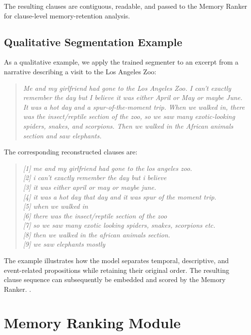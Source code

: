 \documentclass[conference]{IEEEtran}
\begin{document}
The resulting clauses are contiguous, readable, and passed to the Memory Ranker for clause-level memory-retention analysis.

\subsection{Qualitative Segmentation Example}

As a qualitative example, we apply the trained segmenter to an excerpt from a narrative describing a visit to the Los Angeles Zoo:

\begin{quote}
\footnotesize
\textit{Me and my girlfriend had gone to the Los Angeles Zoo. I can't exactly remember the day but I believe it was either April or May or maybe June. It was a hot day and a spur-of-the-moment trip. When we walked in, there was the insect/reptile section of the zoo, so we saw many exotic-looking spiders, snakes, and scorpions. Then we walked in the African animals section and saw elephants.}
\end{quote}

The corresponding reconstructed clauses are:

\begin{quote}
\footnotesize
\textit{[1] me and my girlfriend had gone to the los angeles zoo.}\\
\textit{[2] i can't exactly remember the day but i believe}\\
\textit{[3] it was either april or may or maybe june.}\\
\textit{[4] it was a hot day that day and it was spur of the moment trip.}\\
\textit{[5] when we walked in}\\
\textit{[6] there was the insect/reptile section of the zoo}\\
\textit{[7] so we saw many exotic looking spiders, snakes, scorpions etc.}\\
\textit{[8] then we walked in the african animals section.}\\
\textit{[9] we saw elephants mostly}\\
\end{quote}

The example illustrates how the model separates temporal, descriptive, and event-related propositions while retaining their original order. The resulting clause sequence can subsequently be embedded and scored by the Memory Ranker.
.

\section{Memory Ranking Module}
\end{document}
